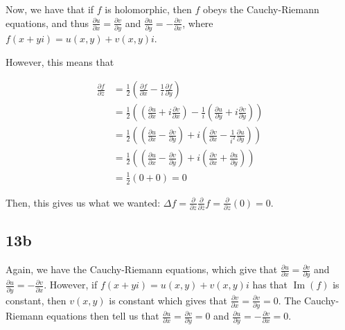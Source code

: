 \documentclass[12pt,letterpaper]{article}
\theoremstyle{definition}
\DeclareMathOperator{\imag}{Im}
\begin{document}
Now, we have that if $f$ is holomorphic, then $f$ obeys the Cauchy-Riemann
equations, and thus $\frac{\partial u}{\partial x} = \frac{\partial v}{\partial
y}$ and $\frac{\partial u}{\partial y} = -\frac{\partial v}{\partial x}$, where
$f(x + yi) = u(x,y) + v(x,y)i$.

However, this means that 

\begin{align*}
  \frac{\partial f}{\partial \bar{z}} &= \frac{1}{2}\left(\frac{\partial f}{\partial x} - \frac{1}{i}\frac{\partial f}{\partial y}\right) \\
                                      &= \frac{1}{2}\left(\left(\frac{\partial u}{\partial x} + i\frac{\partial v}{\partial x}\right) - \frac{1}{i}\left(\frac{\partial u}{\partial y} + i\frac{\partial v}{\partial y}\right)\right) \\
                                      &= \frac{1}{2}\left(\left(\frac{\partial u}{\partial x} - \frac{\partial v}{\partial y}\right) + i\left(\frac{\partial v}{\partial x} - \frac{1}{i^2} \frac{\partial u}{\partial y}\right)\right) \\
                                      &= \frac{1}{2}\left(\left(\frac{\partial u}{\partial x} - \frac{\partial v}{\partial y}\right) + i\left(\frac{\partial v}{\partial x} + \frac{\partial u}{\partial y}\right)\right) \\
                                      &= \frac{1}{2}(0 + 0) = 0
\end{align*}

Then, this gives us what we wanted: $\Delta f = \frac{\partial }{\partial z} \frac{\partial }{\partial \bar{z}} f = \frac{\partial }{\partial z}(0) = 0$.

\subsection*{13b}

Again, we have the Cauchy-Riemann equations, which give that $\frac{\partial u}{\partial x} = \frac{\partial v}{\partial y}$ and $\frac{\partial u}{\partial y} = -\frac{\partial v}{\partial x}$. However, if $f(x + yi) = u(x,y) + v(x,y)i$ has that $\imag(f)$ is constant, then $v(x,y)$ is constant which gives that $\frac{\partial v}{\partial x} = \frac{\partial v}{\partial y} = 0$. The Cauchy-Riemann equations then tell us that $\frac{\partial u}{\partial x} = \frac{\partial v}{\partial y} = 0$ and $\frac{\partial u}{\partial y} = -\frac{\partial v}{\partial x} = 0$. 
\end{document}
